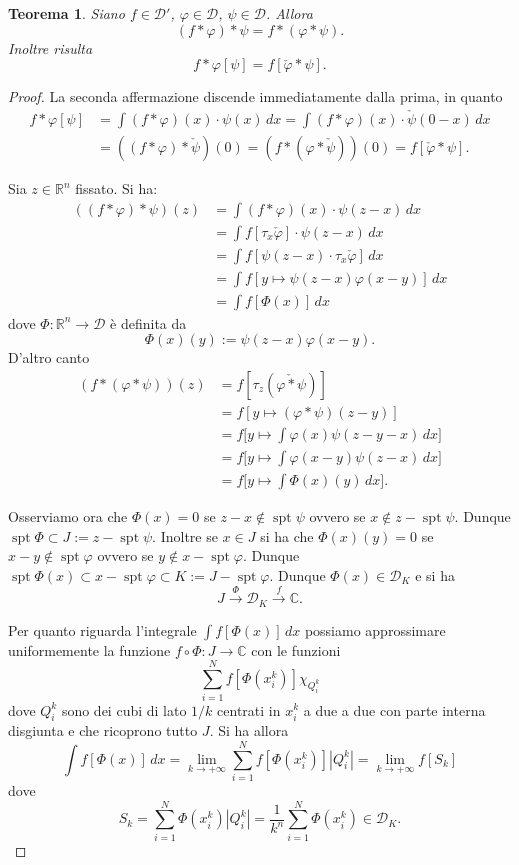 \documentclass[italian,a4paper,oneside,headinclude]{scrbook}
\renewcommand{\phi}{\varphi}
\newcommand{\D}{\mathcal D}
\newcommand{\CC}{\mathbb C}
\newcommand{\RR}{\mathbb R}
\newcommand{\defeq}{:=}
\DeclareMathOperator{\spt}{spt}
\newtheorem{theorem}{Teorema}
\begin{document}
\begin{theorem}
  Siano $f\in\D'$, $\phi\in \D$, $\psi\in\D$. Allora
  \[
  (f * \phi) * \psi
  =
  f*(\phi*\psi).
  \]
  Inoltre risulta
  \[
    f*\phi[\psi] = f[\check \phi * \psi].
  \]
\end{theorem}
%
\begin{proof}
  La seconda affermazione discende immediatamente dalla prima, in quanto
  \begin{align*}
    f*\phi[\psi]
    &= \int (f*\phi)(x) \cdot\psi(x)\, dx
    = \int (f*\phi)(x) \cdot \check \psi(0-x)\, dx \\
    &= ((f*\phi)*\check \psi)(0)
    = (f*(\phi*\check \psi))(0) = f[\check \phi * \psi].
  \end{align*}

  Sia $z\in \RR^n$ fissato.
  Si ha:
  \begin{align*}
    ((f*\phi) * \psi)(z)
    &= \int (f*\phi)(x) \cdot \psi(z-x)\, dx \\
    &= \int f[\tau_x \check \phi]\cdot \psi(z-x)\, dx \\
    &= \int f[\psi(z-x)\cdot\tau_x \check \phi]\, dx \\
    &= \int f[y \mapsto \psi(z-x) \phi(x-y)]\, dx\\
    &= \int f[\Phi(x)]\, dx
  \end{align*}
  dove $\Phi\colon \RR^n \to \D$ è definita da
  \[
  \Phi(x)(y) \defeq \psi(z-x)\phi(x-y).
  \]
  D'altro canto
  \begin{align*}
    (f*(\phi*\psi))(z)
    &= f[\tau_z (\check{\phi*\psi})]\\
    &= f[y\mapsto (\phi*\psi)(z-y)]\\
    &= f\big[y\mapsto \int \phi(x)\psi(z-y-x)\, dx\big]\\
    &= f\big[y\mapsto \int \phi(x-y)\psi(z-x)\, dx\big]\\
    &= f\big[y\mapsto \int \Phi(x)(y)\, dx\big].
  \end{align*}

  Osserviamo ora che $\Phi(x)=0$ se
  $z-x \not\in \spt \psi$ ovvero se $x\not\in z-\spt \psi$.
  Dunque $\spt \Phi \subset J \defeq z-\spt \psi$.
  Inoltre se $x\in J$ si ha che $\Phi(x)(y)=0$
  se $x-y\not \in \spt\phi$ ovvero se $y\not \in x-\spt \phi$.
  Dunque
  $\spt \Phi(x) \subset x-\spt \phi \subset K \defeq J - \spt\phi$.
  Dunque $\Phi(x)\in \D_K$ e si ha
  \[
  J \stackrel\Phi\longrightarrow \D_K \stackrel f\longrightarrow \CC.
  \]

  Per quanto riguarda l'integrale $\int f[\Phi(x)]\, dx$ possiamo
  approssimare uniformemente la funzione $f\circ \Phi\colon J \to \CC$
  con le funzioni
  \[
  \sum_{i=1}^{N} f[\Phi(x_i^k)] \chi_{Q_i^k}
  \]
  dove $Q_i^k$ sono dei cubi di lato $1/k$ centrati in $x_i^k$ a due a
  due con parte
  interna disgiunta e che ricoprono tutto $J$.
  Si ha allora
  \[
  \int f[\Phi(x)]\, dx = \lim_{k\to +\infty} \sum_{i=1}^N
  f[\Phi(x_i^k)] |Q_i^k| = \lim_{k\to +\infty}f[S_k]
  \]
  dove
  \[
  S_k = \sum_{i=1}^N \Phi(x_i^k) |Q_i^k| = \frac{1}{k^n} \sum_{i=1}^N
  \Phi(x_i^k) \in \D_K.
  \]


\end{proof}
\end{document}
